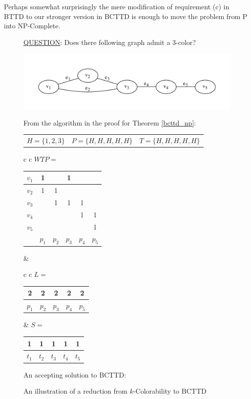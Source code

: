 \documentclass[]{article}
\theoremstyle{definition}
\theoremstyle{remark}
\numberwithin{equation}{section}
\begin{document}
Perhaps somewhat surprisingly the mere modification of requirement (c) in BTTD to our stronger version in BCTTD is enough to move the problem from P into NP-Complete.
\begin{figure}[h]
\caption{An illustration of a reduction from $k$-Colorability to BCTTD}
\underline{QUESTION}: Does there following graph admit a 3-color? \\
\begin{center}
\includegraphics[scale=0.75]{3colorinstance}
\end{center}
From the algorithm in the proof for Theorem \ref{bcttd_np}: \\
\begin{center}
\begin{tabular}{ l c r }
$H=\{1,2,3\}$ & $P=\{H,H,H,H,H\}$ & $T=\{H,H,H,H,H\}$
\end{tabular}
\begin{tabular}{ c c }
$WTP=$ \begin{tabular}{ r | c | c | c | c | c }
$v_1$ & 1 &   & 1 &   &   \\ \hline
$v_2$ & 1 & 1 &   &   &   \\ \hline
$v_3$ &   & 1 & 1 & 1 &   \\ \hline
$v_4$ &   &   &   & 1 & 1 \\ \hline
$v_5$ &   &   &   &   & 1 \\ \hline
      & $p_1$ & $p_2$ & $p_3$ & $p_4$ & $p_5$
\end{tabular} & 
\begin{tabular}{ c c }
$L=$ \begin{tabular}{ c | c | c | c | c }
2 & 2 & 2 & 2 & 2 \\ \hline
$p_1$ & $p_2$ & $p_3$ & $p_4$ & $p_5$
\end{tabular} & $S=$ \begin{tabular}{ c | c | c | c | c }
1 & 1 & 1 & 1 & 1 \\ \hline
$t_1$ & $t_2$ & $t_3$ & $t_4$ & $t_5$
\end{tabular}
\end{tabular} 
\end{tabular}
\end{center}
An accepting solution to BCTTD:
\end{figure}
\end{document}
